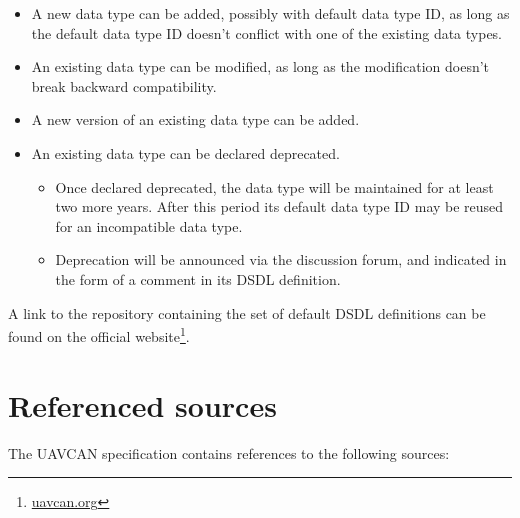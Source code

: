 \begin{itemize}
    \item A new data type can be added, possibly with default data type ID,
    as long as the default data type ID doesn't conflict with one of the existing data types.

    \item An existing data type can be modified, as long as the modification doesn't break backward compatibility.

    \item A new version of an existing data type can be added.

    \item An existing data type can be declared deprecated.
    \begin{itemize}
        \item Once declared deprecated, the data type will be maintained for at least two more years.
        After this period its default data type ID may be reused for an incompatible data type.

        \item Deprecation will be announced via the discussion forum, and indicated in the form of a comment
        in its DSDL definition.
    \end{itemize}
\end{itemize}

A link to the repository containing the set of default DSDL definitions can be found on the official
website\footnote{\href{http://uavcan.org}{uavcan.org}}.

\section{Referenced sources}

The UAVCAN specification contains references to the following sources:

